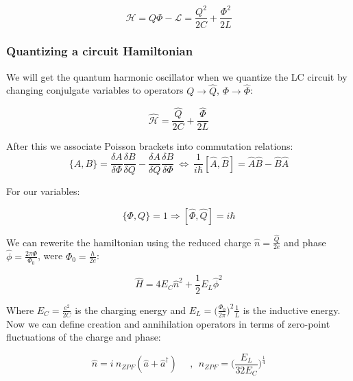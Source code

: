\begin{equation}
    \mathcal{H} = Q\Phi - \mathcal{L} = \frac{Q^2}{2C} + \frac{\Phi^2}{2L}
\end{equation}

\subsubsection{Quantizing a circuit Hamiltonian}
\label{Subsubsec: Quantizing a circuit Hamiltonian}

We will get the quantum harmonic oscillator when we quantize the LC circuit by changing conjulgate variables to operators $Q \rightarrow \hat{Q}$, $\Phi \rightarrow \hat{\Phi}$:

\begin{equation}
    \hat{\mathcal{H}} = \frac{\hat{Q}}{2C} + \frac{\hat{\Phi}}{2L}
\end{equation}

After this we associate Poisson brackets into commutation relations:
\begin{equation}
    \{A, B\} = \frac{\delta A}{\delta \Phi} \frac{\delta B}{\delta Q} - \frac{\delta A}{\delta Q} \frac{\delta B}{\delta \Phi} \ \Leftrightarrow \ \frac{1}{i \hbar} [\hat{A}, \hat{B}] = \hat{A}\hat{B} - \hat{B}\hat{A}
\end{equation}

For our variables:

\begin{equation}
    \{\Phi, Q \} = 1 \Rightarrow [\hat\Phi, \hat Q] = i \hbar
\end{equation}

We can rewerite the hamiltonian using the reduced charge $\hat n = \frac{\hat Q}{2e}$ and phase $\hat \phi = \frac{2 \pi \Phi}{\Phi_0}$, were $\Phi_0 = \frac{h}{2e}$:

\begin{equation}
    \hat H = 4E_C \hat{n}^2 + \frac{1}{2} E_L \hat{\phi}^2
\end{equation}

Where $E_C = \frac{e^2}{2C}$ is the charging energy and $E_L = \bigg(\frac{\Phi_0}{2\pi}\bigg)^2 \frac{1}{L}$ is the inductive energy. Now we can define creation and annihilation operators in terms of zero-point fluctuations of the charge and phase:

\begin{equation}
    \hat n = i \ n_{ZPF} ( \hat a + \hat a^\dagger )\ \ \ \ \ \ , \ \ n_{ZPF} = \bigg( \frac{E_L}{32 E_C} \bigg)^{\frac{1}{4}}
\end{equation}

